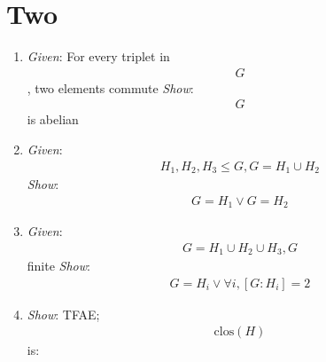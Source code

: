 \hypertarget{two}{%
\section{Two}\label{two}}

\begin{enumerate}
\def\labelenumi{\arabic{enumi}.}
\item
  \emph{Given}: For every triplet in \begin{align*}
  G\end{align*}
  , two elements commute \emph{Show}: \begin{align*}
  G\end{align*}
   is abelian
\item
  \emph{Given}: \begin{align*}
  H_1, H_2, H_3 \leq G, G = H_1 \cup H_2\end{align*}
   \emph{Show}: \begin{align*}
  G=H_1 \vee G=H_2\end{align*}
\item
  \emph{Given}: \begin{align*}
  G=H_1 \cup H_2 \cup H_3, G\end{align*}
   finite \emph{Show}: \begin{align*}
  G=H_i \vee \forall i, [G:H_i] = 2\end{align*}
\item
  \emph{Show}: TFAE; \begin{align*}
  \text{clos}(H)\end{align*}
   is:


\end{enumerate}
